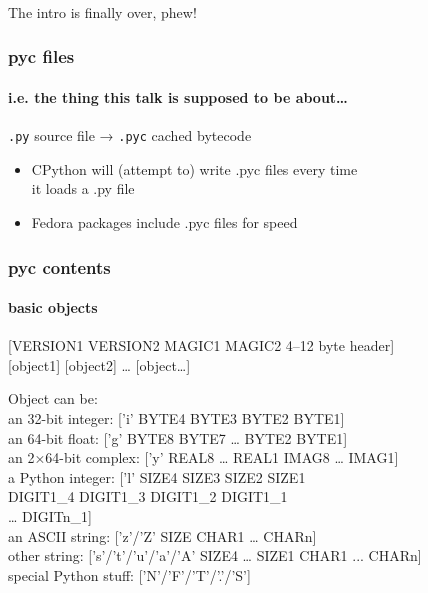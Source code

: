 \documentclass[]{beamer}
\begin{document}
\begin{frame}
  \frametitle{}

  \hfill \large{The intro is finally over, phew!} \hfill{}
\end{frame}

\begin{frame}
  \frametitle{pyc files}
  \framesubtitle{i.e. the thing this talk is supposed to be about…}

  \pause
  \vfill

  \texttt{.py} source file → \texttt{.pyc} cached bytecode
  
  \pause
  \vfill

  \begin{itemize}
  \item CPython will (attempt to) write .pyc files every time\\
    it loads a .py file
  \item Fedora packages include .pyc files for speed
  \end{itemize}

  \vfill
\end{frame}

\begin{frame}
  \frametitle{pyc contents}
  \framesubtitle{basic objects}

  \pause

  [VERSION1 VERSION2 MAGIC1 MAGIC2 4–12 byte header]\\
  {}[object1] [object2] … [object…]

  \vfill
  \pause

  Object can be:\\\pause
  an 32-bit integer: ['i' BYTE4 BYTE3 BYTE2 BYTE1]\\\pause
  an 64-bit float: ['g' BYTE8 BYTE7 … BYTE2 BYTE1]\\\pause
  an 2×64-bit complex: ['y' REAL8 … REAL1 IMAG8 … IMAG1]\\\pause
  a Python integer: ['l' SIZE4 SIZE3 SIZE2 SIZE1\\
    \phantom{x} \hfill DIGIT1\_4 DIGIT1\_3 DIGIT1\_2 DIGIT1\_1\phantom{]}\\
    \phantom{x} \hfill … DIGITn\_1] \\\pause
  an ASCII string: ['z'/'Z' SIZE CHAR1 … CHARn]\\\pause
  other string: ['s'/'t'/'u'/'a'/'A' SIZE4 … SIZE1 CHAR1 ... CHARn]\\\pause
  special Python stuff: ['N'/'F'/'T'/'.'/'S']
\end{frame}
\end{document}

